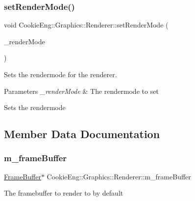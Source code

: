 \subsubsection{\texorpdfstring{set\+Render\+Mode()}{setRenderMode()}}
{\footnotesize\ttfamily void Cookie\+Eng\+::\+Graphics\+::\+Renderer\+::set\+Render\+Mode (\begin{DoxyParamCaption}\item[{Render\+Mode}]{\+\_\+render\+Mode }\end{DoxyParamCaption})\hspace{0.3cm}{\ttfamily [inline]}}



Sets the rendermode for the renderer. 


\begin{DoxyParams}{Parameters}
{\em \+\_\+render\+Mode} & The rendermode to set\\
\hline
\end{DoxyParams}
Sets the rendermode 

\subsection{Member Data Documentation}
\mbox{\label{class_cookie_eng_1_1_graphics_1_1_renderer_a64f992d6d2476fe2ea641f31a46f006e}} 
\subsubsection{\texorpdfstring{m\+\_\+frame\+Buffer}{m\_frameBuffer}}
{\footnotesize\ttfamily \hyperlink{class_cookie_eng_1_1_graphics_1_1_frame_buffer}{Frame\+Buffer}$\ast$ Cookie\+Eng\+::\+Graphics\+::\+Renderer\+::m\+\_\+frame\+Buffer\hspace{0.3cm}{\ttfamily [protected]}}

The framebuffer to render to by default \mbox{\label{class_cookie_eng_1_1_graphics_1_1_renderer_af4068b4414967468816ecea24ae30513}} 
